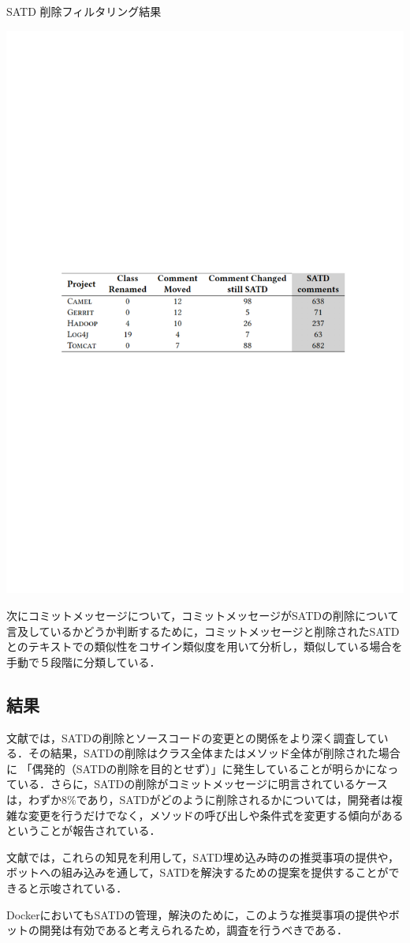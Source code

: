 \begin{table}[t]
    \centering
    \caption{SATD 削除フィルタリング結果}
    \includegraphics[width=0.9\linewidth, angle=0]{./thesis2/satd-failer-alarm2.pdf}
    \label{fig:2_satd-failer-alarm}
\end{table}

次にコミットメッセージについて，コミットメッセージがSATDの削除について言及しているかどうか判断するために，コミットメッセージと削除されたSATDとのテキストでの類似性をコサイン類似度を用いて分析し，類似している場合を手動で５段階に分類している．

\subsection{結果}
文献\cite{satd-real-removal}では，SATDの削除とソースコードの変更との関係をより深く調査している．その結果，SATDの削除はクラス全体またはメソッド全体が削除された場合に 「偶発的（SATDの削除を目的とせず）」に発生していることが明らかになっている．さらに，SATDの削除がコミットメッセージに明言されているケースは，わずか8\%であり，SATDがどのように削除されるかについては，開発者は複雑な変更を行うだけでなく，メソッドの呼び出しや条件式を変更する傾向があるということが報告されている．

文献\cite{satd-real-removal}では，これらの知見を利用して，SATD埋め込み時のの推奨事項の提供や，ボットへの組み込みを通して，SATDを解決するための提案を提供することができると示唆されている．

DockerにおいてもSATDの管理，解決のために，このような推奨事項の提供やボットの開発は有効であると考えられるため，調査を行うべきである．
